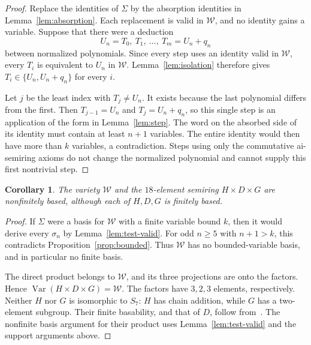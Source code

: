 \documentclass[11pt,reqno]{amsart}
\numberwithin{equation}{section}
\newtheorem{corollary}[theorem]{Corollary}
\theoremstyle{definition}
\theoremstyle{remark}
\DeclareMathOperator{\Var}{Var}
\newcommand{\W}{\mathcal W}
\begin{document}
\begin{proof}
Replace the identities of $\Sigma$ by the absorption
identities in Lemma~\ref{lem:absorption}. Each replacement
is valid in $\W$, and no identity gains a variable.
Suppose that there were a deduction
\[
U_n=T_0,\ T_1,\ \ldots,\ T_m=U_n+q_n
\]
between normalized polynomials. Since every step uses an
identity valid in $\W$, every $T_i$ is equivalent to
$U_n$ in $\W$. Lemma~\ref{lem:isolation} therefore gives
$T_i\in\{U_n,U_n+q_n\}$ for every $i$.

Let $j$ be the least index with $T_j\neq U_n$. It exists
because the last polynomial differs from the first.
Then $T_{j-1}=U_n$ and $T_j=U_n+q_n$, so this single
step is an application of the form in Lemma~\ref{lem:step}.
The word on the absorbed side of its identity must contain
at least $n+1$ variables. The entire identity would then
have more than $k$ variables, a contradiction. Steps
using only the commutative ai-semiring axioms do not
change the normalized polynomial and cannot supply this
first nontrivial step.
\end{proof}

\begin{corollary}\label{cor:small-product}
The variety $\W$ and the $18$-element semiring $H\times D\times G$
are nonfinitely based, although each of $H,D,G$ is finitely based.
\end{corollary}

\begin{proof}
If $\Sigma$ were a basis for $\W$ with a finite variable bound $k$,
then it would derive every $\sigma_n$ by
Lemma~\ref{lem:test-valid}. For odd $n\geq5$ with $n+1>k$,
this contradicts Proposition~\ref{prop:bounded}.
Thus $\W$ has no bounded-variable basis, and in particular no
finite basis.

The direct product belongs to $\W$, and its three projections
are onto the factors. Hence $\Var(H\times D\times G)=\W$.
The factors have $3,2,3$ elements, respectively. Neither
$H$ nor $G$ is isomorphic to $S_7$: $H$ has chain addition,
while $G$ has a two-element subgroup. Their finite basability,
and that of $D$, follow from~\cite[Corollary~5.1]{JRZ}.
The nonfinite basis argument for their product uses
Lemma~\ref{lem:test-valid} and the support arguments above.
\end{proof}
\end{document}
